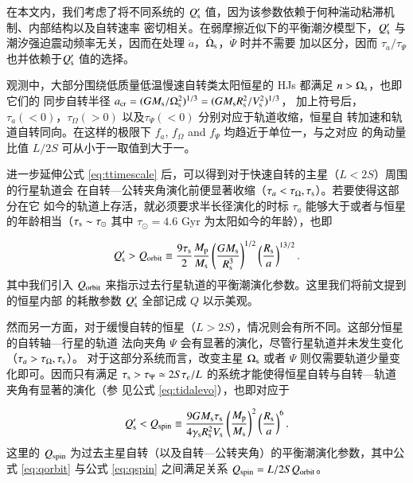在本文内，我们考虑了将不同系统的 $Q_\mathrm{s}^\prime$ 值，因为该参数依赖于何种湍动粘滞机制\cite{
Zahn1977,Goldreich1989,Penev2007}、内部结构\cite{Terquem1998,Goodman2009}以及自转速率
\cite{Ogilvie2007,Barker2009}密切相关。在弱摩擦近似下的平衡潮汐模型下，$Q_\mathrm{s}^\prime$ 与
潮汐强迫震动频率无关，因而在处理 $\dot{a}$，$\dot{\Omega}_\mathrm{s}$，$\dot{\varPsi}$ 时并不需要
加以区分，因而 $\tau_a / \tau_\Psi$ 也并依赖于$Q_\mathrm{s}^\prime$ 值的选择。

观测中，大部分围绕低质量低温慢速自转类太阳恒星的 HJs 都满足 $n>\Omega_\mathrm{s}$，也即它们的
同步自转半径 $a_\mathrm{cr} = (GM_\mathrm{s}/\Omega_\mathrm{s}^2)^{1/3} = (GM_\mathrm{s}R_\mathrm{s}^2/V_\mathrm{s}^2)^{1/3}$，
加上符号后，$\tau_a (<0)$，$\tau_\Omega (>0)$ 以及$\tau_\Psi (<0)$ 分别对应于轨道收缩，恒星自
转加速和轨道自转同向。在这样的极限下 $f_a$, $f_\Omega$ and $f_\Psi$ 均趋近于单位一，与之对应
的角动量比值 $L/2S$ 可从小于一取值到大于一。

进一步延伸公式 \ref{eq:ttimescale} 后，可以得到对于快速自转的主星（$L<2S$）周围的行星轨道会
在自转---公转夹角演化前便显著收缩（$\tau_a < \tau_{\Omega},\tau_\mathrm{s}$）。若要使得这部分在它
如今的轨道上存活，就必须要求半长径演化的时标 $\tau_a$ 能够大于或者与恒星的年龄相当（$\tau_
\mathrm{s}\sim \tau_\odot$ 其中 $\tau_\odot =4.6$ Gyr 为太阳如今的年龄），也即

\begin{equation} \label{eq:qorbit} 
Q_\mathrm{s}^\prime > Q_{\rm orbit} \equiv {9 \tau_\mathrm{s} \over 2} 
{M_\mathrm{p} \over M_\mathrm{s}}  \left( {G M_\mathrm{s} \over R_\mathrm{s}^3} \right)^{1/2}
\left({R_\mathrm{s} \over a} \right)^{13/2}.
\end{equation}  %
其中我们引入 $Q_{\rm orbit}$ 来指示过去行星轨道的平衡潮演化参数。这里我们将前文提到的恒星内部
的耗散参数 $Q_\mathrm{s}^\prime $ 全部记成 $Q$ 以示美观。

然而另一方面，对于缓慢自转的恒星（$L>2S$），情况则会有所不同。这部分恒星的自转轴---行星的轨道
法向夹角 $\Psi$ 会有显著的演化，尽管行星轨道并未发生变化（$\tau_a >\tau_{\Omega},\tau_{\mathrm{s}}$）。
对于这部分系统而言，改变主星 $\Omega_\mathrm{s}$ 或者 $\Psi$ 则仅需要轨道少量变化即可。因而只有满足
$\tau_\mathrm{s}>\tau_\Psi \simeq 2S \tau_e/L$ 的系统才能使得恒星自转与自转---轨道夹角有显著的演化（参
见公式 \ref{eq:tidalevo}），也即对应于

\begin{equation}  \label{eq:qspin}
Q_\mathrm{s}^\prime < Q_{\rm spin} \equiv {9 G M_\mathrm{s} \tau_\mathrm{s} 
\over 4 \gamma_\mathrm{s} R_\mathrm{s}^2 V_\mathrm{s}} 
\left( {M_\mathrm{p} \over M_\mathrm{s}} \right)^2 
\left({R_\mathrm{s} \over a} \right)^{6}.
\end{equation} %
这里的 $Q_{\rm spin} $ 为过去主星自转（以及自转---公转夹角）的平衡潮演化参数，其中公式 \ref{eq:qorbit} 
与公式 \ref{eq:qspin} 之间满足关系 $Q_{\rm spin} = L/2S Q_{\rm orbit}$。

